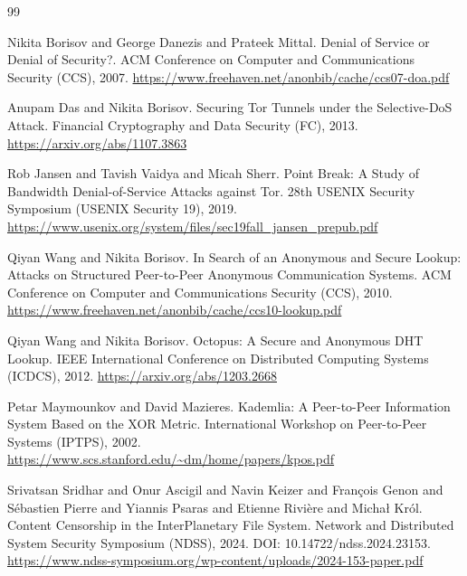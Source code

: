 \documentclass[11pt]{article}
\begin{document}
\begin{thebibliography}{99}\small

Nikita Borisov and George Danezis and Prateek Mittal.
\newblock Denial of Service or Denial of Security?.
\newblock ACM Conference on Computer and Communications Security (CCS), 2007.
\newblock \url{https://www.freehaven.net/anonbib/cache/ccs07-doa.pdf}

Anupam Das and Nikita Borisov.
\newblock Securing {Tor} Tunnels under the Selective-{DoS} Attack.
\newblock Financial Cryptography and Data Security (FC), 2013.
\newblock \url{https://arxiv.org/abs/1107.3863}

Rob Jansen and Tavish Vaidya and Micah Sherr.
\newblock Point Break: A Study of Bandwidth Denial-of-Service Attacks against {Tor}.
\newblock 28th {USENIX} Security Symposium ({USENIX} Security 19), 2019.
\newblock \url{https://www.usenix.org/system/files/sec19fall_jansen_prepub.pdf}

Qiyan Wang and Nikita Borisov.
\newblock In Search of an Anonymous and Secure Lookup: Attacks on Structured Peer-to-Peer Anonymous Communication Systems.
\newblock ACM Conference on Computer and Communications Security (CCS), 2010.
\newblock \url{https://www.freehaven.net/anonbib/cache/ccs10-lookup.pdf}

Qiyan Wang and Nikita Borisov.
\newblock Octopus: A Secure and Anonymous {DHT} Lookup.
\newblock IEEE International Conference on Distributed Computing Systems (ICDCS), 2012.
\newblock \url{https://arxiv.org/abs/1203.2668}

Petar Maymounkov and David Mazieres.
\newblock Kademlia: A Peer-to-Peer Information System Based on the {XOR} Metric.
\newblock International Workshop on Peer-to-Peer Systems (IPTPS), 2002.
\newblock \url{https://www.scs.stanford.edu/~dm/home/papers/kpos.pdf}

Srivatsan Sridhar and Onur Ascigil and Navin Keizer and Fran\c{c}ois Genon and S\'ebastien Pierre and Yiannis Psaras and Etienne Rivi\`ere and Micha\l{} Kr\'ol.
\newblock Content Censorship in the {InterPlanetary} File System.
\newblock Network and Distributed System Security Symposium (NDSS), 2024.
\newblock DOI: 10.14722/ndss.2024.23153.
\newblock \url{https://www.ndss-symposium.org/wp-content/uploads/2024-153-paper.pdf}


\end{thebibliography}
\end{document}

